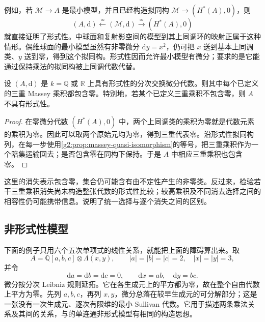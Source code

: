 例如，若 \(\mathcal M\to A\) 是最小模型，并且已经构造拟同构 \(\mathcal M\to(H^*(A),0)\)，则
\[
	(A,\mathrm d)\xleftarrow{\simeq}(\mathcal M,\mathrm d)
	\xrightarrow{\simeq}(H^*(A),0)
\]
就直接证明了形式性。中球面和复射影空间的模型到其上同调环的映射正属于这种情形。偶维球面的最小模型虽然有非零微分 \(\mathrm dy=x^2\)，仍可把 \(x\) 送到基本上同调类、\(y\) 送到零，得到这个拟同构。形式性因而允许最小模型有微分；要求的是它能通过保持乘法的拟同构被上同调代数代替。

\begin{proposition}\label{g2:prop:formality-massey-obstruction}
	设 \((A,\mathrm d)\) 是 \(k=\mathbb Q\) 或 \(\mathbb R\) 上具有形式性的分次交换微分代数。则其中每个已定义的三重 Massey 乘积都包含零。特别地，若某个已定义三重乘积不包含零，则 \(A\) 不具有形式性。
\end{proposition}
\begin{proof}
	在零微分代数 \((H^*(A),0)\) 中，两个上同调类的乘积为零就是代数元素的乘积为零。因此可以取两个原始元均为零，得到三重代表零。沿形式性拟同构列，在每一步使用\cref{g2:prop:massey-quasi-isomorphism}的等号，把三重乘积作为一个陪集运输回去；是否包含零在同构下保持。于是 \(A\) 中相应三重乘积也包含零。
\end{proof}

这里的消失表示包含零，集合仍可能含有由不定性产生的非零类。反过来，检验若干三重乘积消失尚未构造整张代数的形式性比较；较高乘积及不同消去选择之间的相容性仍可能携带信息。\cite[第4节，第262页]{DeligneGriffithsMorganSullivan1975}说明了统一选择与逐个消失之间的区别。

\subsection{非形式性模型}
\label{g2:subsec:E04:04}

下面的例子只用六个五次单项式的线性关系，就能把上面的障碍算出来。取
\begin{equation}\label{g2:eq:nonformal-cdga}
	A=\mathbb Q[a,b,c]\otimes\Lambda(x,y),\qquad
	|a|=|b|=|c|=2,\quad |x|=|y|=3,
\end{equation}
并令
\[
	\mathrm da=\mathrm db=\mathrm dc=0,\qquad
	\mathrm dx=ab,\quad \mathrm dy=bc.
\]
微分按分次 Leibniz 规则延拓。它在各生成元上的平方都为零，故在整个自由代数上平方为零。先列 \(a,b,c\)，再列 \(x,y\)，微分总落在较早生成元的可分解部分；这是一张没有一次生成元、逐次有限维的最小 Sullivan 代数。它用于描述两条乘法关系及其间的关系，与\cite[第4节，第261页]{DeligneGriffithsMorganSullivan1975}的单连通非形式模型有相同的构造思想。

